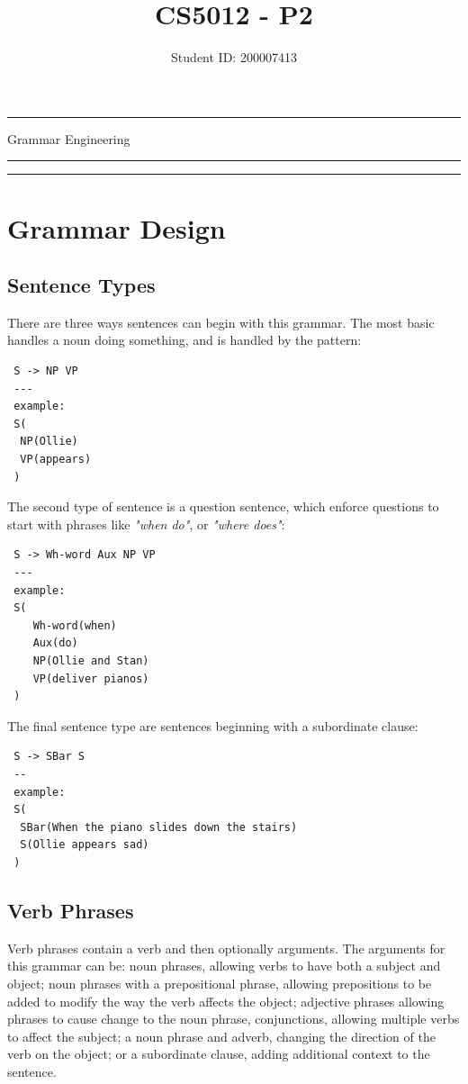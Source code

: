 \documentclass[12pt, a4paper]{article}
\title{CS5012 - P2}
\author{Student ID: 200007413}
\begin{document}
\hrule

{\huge Grammar Engineering}

{\LARGE\thetitle}

\vspace{1ex}
\hrule

{\Large\theauthor}

\vspace{1ex}
\hrule
\vspace{1ex}

\section{Grammar Design}

\subsection{Sentence Types}

There are three ways sentences can begin with this grammar. 
The most basic handles a noun doing something, and is handled by the pattern:

\begin{lstlisting}
 S -> NP VP
 ---
 example:
 S(
  NP(Ollie)
  VP(appears)
 )
\end{lstlisting}

The second type of sentence is a question sentence, which enforce questions to start with phrases like \textit{"when do"}, or \textit{"where does"}:

\begin{lstlisting}
 S -> Wh-word Aux NP VP
 ---
 example:
 S(
    Wh-word(when)
    Aux(do)
    NP(Ollie and Stan)
    VP(deliver pianos)
 )
\end{lstlisting}

The final sentence type are sentences beginning with a subordinate clause:

\begin{lstlisting}
 S -> SBar S
 --
 example:
 S(
  SBar(When the piano slides down the stairs) 
  S(Ollie appears sad)
 )
\end{lstlisting}

\subsection{Verb Phrases}

Verb phrases contain a verb and then optionally arguments. The arguments for this grammar can be: noun phrases, allowing verbs to have both a subject and object; noun phrases with a prepositional phrase, allowing prepositions to be added to modify the way the verb affects the object; adjective phrases allowing phrases to cause change to the noun phrase, conjunctions, allowing multiple verbs to affect the subject; a noun phrase and adverb, changing the direction of the verb on the object; or a subordinate clause, adding additional context to the sentence.
\end{document}
